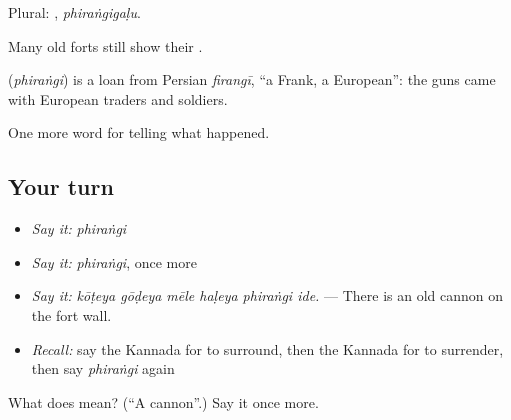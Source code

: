 Plural: , \emph{phiraṅgigaḷu}.

Many old forts still show their .

\begin{cousinweb}
\textbf{} (\emph{phiraṅgi}) is a loan from Persian \emph{firangī}, \textquotedblleft{}a Frank, a European\textquotedblright{}: the guns came with European traders and soldiers.
\end{cousinweb}

\begin{grammarlens}[title={What you've built}]
One more word for telling what happened.
\end{grammarlens}

\subsection*{Your turn}
\begin{itemize}
\raggedright
  \item \emph{Say it:} \emph{phiraṅgi}
  \item \emph{Say it:} \emph{phiraṅgi}, once more
  \item \emph{Say it:} \emph{kōṭeya gōḍeya mēle haḷeya phiraṅgi ide.} — There is an old cannon on the fort wall.
  \item \emph{Recall:} say the Kannada for to surround, then the Kannada for to surrender, then say \emph{phiraṅgi} again
\end{itemize}

\begin{tcolorbox}[breakable,colback=teal!4,colframe=teal!35!black,title={Before you move on}]
What does  mean? (\textquotedblleft{}A cannon\textquotedblright{}.) Say it once more.
\end{tcolorbox}
